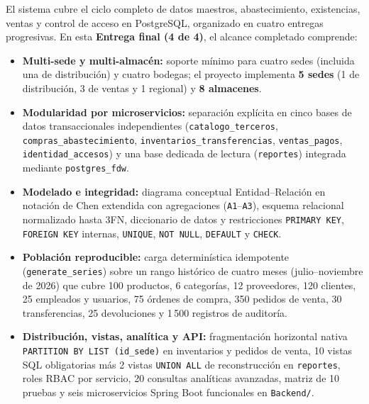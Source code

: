 \documentclass[11pt,oneside]{article}
\begin{document}
El sistema cubre el ciclo completo de datos maestros, abastecimiento,
existencias, ventas y control de acceso en PostgreSQL, organizado en cuatro
entregas progresivas. En esta \textbf{Entrega final (4 de 4)}, el alcance
completado comprende:

\begin{itemize}[leftmargin=1.5em, itemsep=3pt]
  \item \textbf{Multi-sede y multi-almac\'en:} soporte m\'inimo para cuatro
        sedes (incluida una de distribuci\'on) y cuatro bodegas; el proyecto
        implementa \textbf{5 sedes} (1 de distribuci\'on, 3 de
        ventas y 1 regional) y \textbf{8 almacenes}.
  \item \textbf{Modularidad por microservicios:} separaci\'on expl\'icita en
        cinco bases de datos transaccionales independientes
        (\texttt{catalogo\_\allowbreak terceros},
        \texttt{compras\_\allowbreak abastecimiento},
        \texttt{inventarios\_\allowbreak transferencias},
        \texttt{ventas\_\allowbreak pagos},
        \texttt{identidad\_\allowbreak accesos}) y una base dedicada de lectura
        (\texttt{reportes}) integrada mediante \texttt{postgres\_fdw}.
  \item \textbf{Modelado e integridad:} diagrama conceptual Entidad--Relaci\'on
        en notaci\'on de Chen extendida con agregaciones (\texttt{A1}--\texttt{A3}),
        esquema relacional normalizado hasta 3FN, diccionario de datos y
        restricciones \texttt{PRIMARY KEY}, \texttt{FOREIGN KEY} internas,
        \texttt{UNIQUE}, \texttt{NOT NULL}, \texttt{DEFAULT} y \texttt{CHECK}.
  \item \textbf{Poblaci\'on reproducible:} carga determin\'istica idempotente
        (\texttt{generate\_series}) sobre un rango hist\'orico de cuatro meses
        (julio--noviembre de 2026) que cubre 100 productos, 6 categor\'ias, 12
        proveedores, 120 clientes, 25 empleados y usuarios, 75 \'ordenes de
        compra, 350 pedidos de venta, 30 transferencias, 25 devoluciones y
        1\,500 registros de auditor\'ia.
  \item \textbf{Distribuci\'on, vistas, anal\'itica y API:} fragmentaci\'on
        horizontal nativa \texttt{PARTITION BY LIST (id\_sede)} en inventarios
        y pedidos de venta, 10 vistas SQL obligatorias m\'as 2 vistas
        \texttt{UNION ALL} de reconstrucci\'on en \texttt{reportes}, roles RBAC
        por servicio, 20 consultas anal\'iticas avanzadas, matriz de 10 pruebas
        y seis microservicios Spring Boot funcionales en \texttt{Backend/}.
\end{itemize}
\end{document}
